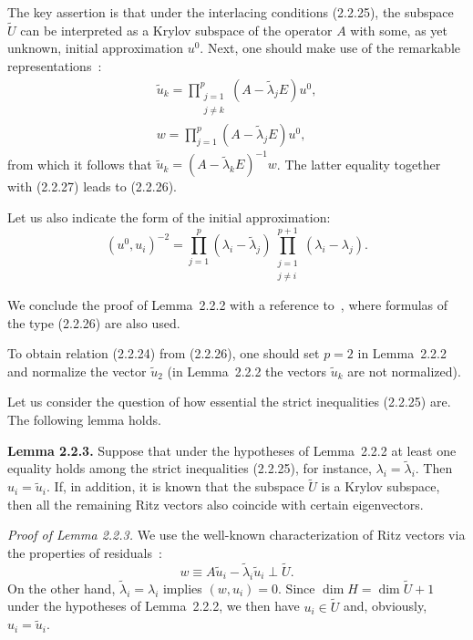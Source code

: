 \documentclass[11pt,oneside]{book}
\begin{document}
The key assertion is that under the interlacing conditions (2.2.25), the subspace $\widetilde{U}$ can be interpreted as a Krylov subspace of the operator $A$ with some, as yet unknown, initial
approximation $u^0$. Next, one should make use of the remarkable representations~\citep[formula~(12.3.7)]{Parlett1983}:
\begin{gather*}
\tilde{u}_k = \prod_{\substack{j=1 \\ j \neq k}}^p (A - \tilde{\lambda}_j E) u^0, \\
w = \prod_{j=1}^p (A - \tilde{\lambda}_j E) u^0,
\end{gather*}
from which it follows that $\tilde{u}_k = (A - \tilde{\lambda}_k E)^{-1} w$. The latter equality together with (2.2.27) leads to (2.2.26).

Let us also indicate the form of the initial approximation:
\[
(u^0, u_i)^{-2} = \prod_{j=1}^p (\lambda_i - \tilde{\lambda}_j) \prod_{\substack{j=1 \\ j \neq i}}^{p+1} (\lambda_i - \lambda_j).
\]

We conclude the proof of Lemma~2.2.2 with a reference to~\citep{Weinberger1960}, where formulas of the type (2.2.26) are also used.

To obtain relation (2.2.24) from (2.2.26), one should set $p = 2$ in Lemma~2.2.2 and normalize the vector $\tilde{u}_2$ (in Lemma~2.2.2 the vectors $\tilde{u}_k$ are not normalized).

Let us consider the question of how essential the strict inequalities (2.2.25) are. The following lemma holds.

\textbf{Lemma 2.2.3.} Suppose that under the hypotheses of Lemma~2.2.2 at least one equality holds among the strict inequalities (2.2.25), for instance, $\lambda_i = \tilde{\lambda}_i$. Then $u_i = \tilde{u}_i$. If, in addition, it is known that the subspace $\widetilde{U}$ is a Krylov subspace, then all the remaining Ritz vectors also coincide with certain eigenvectors.

\textit{Proof of Lemma 2.2.3.} We use the well-known characterization of Ritz vectors via the properties of residuals~\citep[Exercise~11.4.6]{Parlett1983}:
\[
w \equiv A\tilde{u}_i - \tilde{\lambda}_i \tilde{u}_i \perp \widetilde{U}.
\]
On the other hand, $\tilde{\lambda}_i = \lambda_i$ implies $(w, u_i) = 0$. Since $\dim H = \dim \widetilde{U} + 1$ under the hypotheses of Lemma~2.2.2, we then have $u_i \in \widetilde{U}$ and, obviously, $u_i = \tilde{u}_i$.
\end{document}
